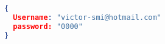 \begin{lstlisting}[language=json,firstnumber=1]
{
  Username: "victor-smi@hotmail.com"
  password: "0000"
}
\end{lstlisting}
